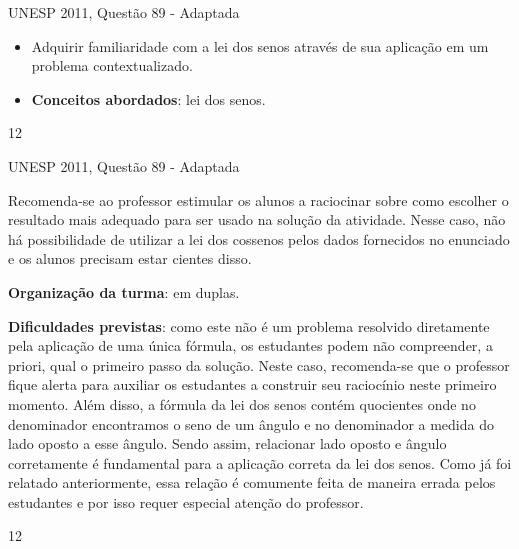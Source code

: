 \clearmargin
\def\currentcolor{session2}
\begin{objectives}{UNESP 2011, Questão 89 - Adaptada}
{
\begin{itemize}
\item Adquirir familiaridade com a lei dos senos através de sua aplicação em um problema contextualizado.

\item \textbf{Conceitos abordados}: lei dos senos.
\end{itemize}
}{1}{2}
\end{objectives}
\begin{sugestions}{UNESP 2011, Questão 89 - Adaptada}
{
Recomenda-se ao professor estimular os alunos a raciocinar sobre como escolher o resultado mais adequado para ser usado na solução da atividade. Nesse caso, não há possibilidade de utilizar a lei dos cossenos pelos dados fornecidos no enunciado e os alunos precisam estar cientes disso. 

\textbf{Organização da turma}: em duplas.

\textbf{Dificuldades previstas}: como este não é um problema resolvido diretamente pela aplicação de uma única fórmula, os estudantes podem não compreender, a priori, qual o primeiro passo da solução. 
%
Neste caso, recomenda-se que o professor fique  alerta para auxiliar os estudantes a construir seu raciocínio neste primeiro momento. 
%
Além disso, a fórmula da lei dos senos contém quocientes onde no denominador encontramos o seno de um ângulo e no denominador a medida do lado oposto a esse ângulo. 
%
Sendo assim, relacionar lado oposto e ângulo corretamente é fundamental para a aplicação correta da lei dos senos. Como já foi relatado anteriormente, essa relação é comumente feita de maneira errada pelos estudantes e por isso requer especial atenção do professor.
}{1}{2}
\end{sugestions}

